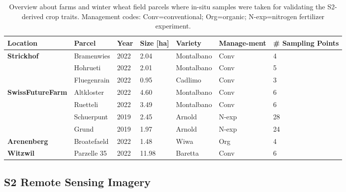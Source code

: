 \begin{table}[H]
\caption{Overview about farms and winter wheat field parcels where in-situ samples were taken for validating the S2-derived crop traits. Management codes: Conv=conventional; Org=organic; N-exp=nitrogen fertilizer experiment.}
\label{tab:site_characteristics}
\setlength\extrarowheight{2pt}
\begin{tabularx}{\textwidth}{p{2.5cm}p{2.3cm}p{0.7cm}p{0.7cm}p{1.8cm}p{1.9cm}p{1cm}}
\toprule
\textbf{Location}          & \textbf{Parcel} & \textbf{Year} & \textbf{Size {[}ha{]}}  & \textbf{Variety} & \textbf{Manage-\newline ment} & \textbf{\# Sampling Points}  \\ \midrule
\multirow{3}{*}{\textbf{Strickhof}}       & Bramenwies      & 2022          & 2.04     & Montalbano       & Conv        & 4                          \\
         & Hohrueti        & 2022          & 2.01     & Montalbano       & Conv        & 5                            \\
         & Fluegenrain     & 2022          & 0.95       & Cadlimo          & Conv        & 3                            \\
\hline
\multirow{4}{*}{\textbf{SwissFutureFarm}}  & Altkloster      & 2022          & 4.60       & Montalbano       & Conv        & 6                            \\
 & Ruetteli        & 2022          & 3.49        & Montalbano       & Conv        & 6                            \\
 & Schuerpunt       & 2019          & 2.45         & Arnold           & N-exp        & 28                           \\
 & Grund           & 2019          & 1.97       & Arnold           & N-exp        & 24                          \\
\hline
\textbf{Arenenberg}        & Broatefaeld     & 2022          & 1.48         & Wiwa             & Org             & 4                                 \\
\hline
\textbf{Witzwil}           & Parzelle 35      & 2022          & 11.98     & Baretta          & Conv       & 6                              \\ \bottomrule
\end{tabularx}
\end{table}


\subsection{S2 Remote Sensing Imagery}
\label{subsec:rs-data}

